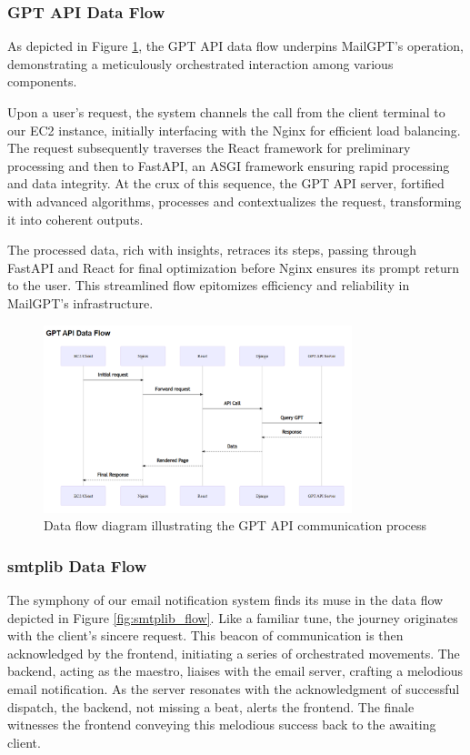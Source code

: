 \documentclass[12pt]{article}
\begin{document}
\subsubsection{GPT API Data Flow}

As depicted in Figure \ref{fig:gpt_api_flow}, the GPT API data flow underpins MailGPT's operation, demonstrating a meticulously orchestrated interaction among various components.

Upon a user's request, the system channels the call from the client terminal to our EC2 instance, initially interfacing with the Nginx for efficient load balancing. The request subsequently traverses the React framework for preliminary processing and then to FastAPI, an ASGI framework ensuring rapid processing and data integrity. At the crux of this sequence, the GPT API server, fortified with advanced algorithms, processes and contextualizes the request, transforming it into coherent outputs.

The processed data, rich with insights, retraces its steps, passing through FastAPI and React for final optimization before Nginx ensures its prompt return to the user. This streamlined flow epitomizes efficiency and reliability in MailGPT's infrastructure.


\begin{figure}[ht]
	\centering
	\includegraphics[width=0.8\textwidth]{gpt_api_flow.png}
	\caption{Data flow diagram illustrating the GPT API communication process}
	\label{fig:gpt_api_flow}
\end{figure}

\subsubsection{smtplib Data Flow}

The symphony of our email notification system finds its muse in the data flow depicted in Figure \ref{fig:smtplib_flow}. Like a familiar tune, the journey originates with the client's sincere request. This beacon of communication is then acknowledged by the frontend, initiating a series of orchestrated movements. The backend, acting as the maestro, liaises with the email server, crafting a melodious email notification. As the server resonates with the acknowledgment of successful dispatch, the backend, not missing a beat, alerts the frontend. The finale witnesses the frontend conveying this melodious success back to the awaiting client.
\end{document}
